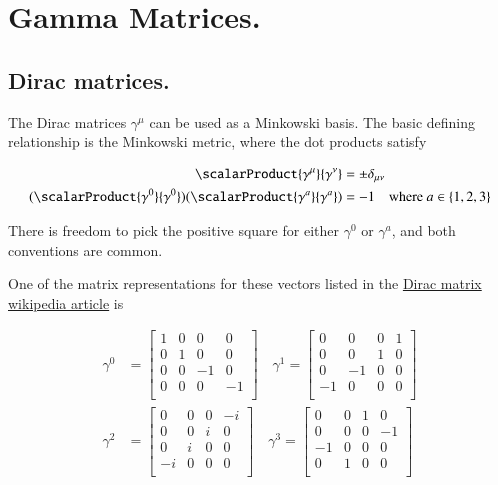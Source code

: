 \chapter{Gamma Matrices.}\label{chap:PJDiracGamma}
\date{Dec 13, 2008.  gamma.tex}

\section{Dirac matrices. }

The Dirac matrices $\gamma^\mu$ can be used as a Minkowski basis.  The basic defining relationship is the Minkowski metric, where the dot products satisfy

\begin{align*}
\scalarProduct{\gamma^\mu}{\gamma^\nu} &= \pm \delta_{\mu\nu} \\
(\scalarProduct{\gamma^0}{\gamma^0})(\scalarProduct{\gamma^a}{\gamma^a}) &= -1 \quad \text{where $a \in \{1,2,3\}$}
\end{align*}

There is freedom to pick the positive square for either $\gamma^0$ or $\gamma^a$, and both conventions are common.

One of the matrix representations for these vectors listed in the 
\href{http://en.wikipedia.org/wiki/Gamma_matrices}{Dirac matrix wikipedia article}
is

\begin{align}\label{eqn:gamma:basis}
\gamma^0 &= \begin{bmatrix}
 1  &  0  &  0  &  0  \\
 0  &  1  &  0  &  0  \\
 0  &  0  &  -1  &  0  \\
 0  &  0  &  0  &  -1  \\
\end{bmatrix} \quad
\gamma^1 = \begin{bmatrix}
 0  &  0  &  0  &  1  \\
 0  &  0  &  1  &  0  \\
 0  &  -1  &  0  &  0  \\
 -1  &  0  &  0  &  0  \\
\end{bmatrix} \\
\gamma^2 &= \begin{bmatrix}
 0  &  0  &  0  &  -i  \\
 0  &  0  &  i  &  0  \\
 0  &  i  &  0  &  0  \\
 -i  &  0  &  0  &  0  \\
\end{bmatrix}
\quad \gamma^3 = \begin{bmatrix}
 0  &  0  &  1  &  0  \\
 0  &  0  &  0  &  -1  \\
 -1  &  0  &  0  &  0  \\
 0  &  1  &  0  &  0  \\
\end{bmatrix}
\end{align}


